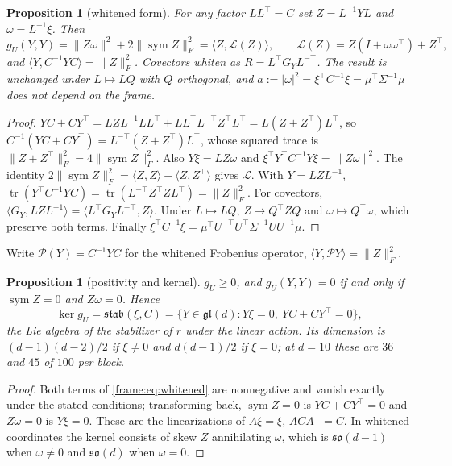 \documentclass[11pt]{article}
\newtheorem{proposition}[theorem]{Proposition}
\theoremstyle{definition}
\theoremstyle{remark}
\providecommand{\gl}{\mathfrak{gl}}
\providecommand{\tr}{\operatorname{tr}}
\providecommand{\sym}{\operatorname{sym}}
\providecommand{\stab}{\mathfrak{stab}}
\providecommand{\ip}[2]{\langle #1, #2\rangle}
\begin{document}
\begin{proposition}[whitened form]\label{frame:prop:whitened}
For any factor $LL^\top=C$ set $Z=L^{-1}YL$ and $\omega=L^{-1}\xi$. Then
\begin{equation}\label{frame:eq:whitened}
g_U(Y,Y)=\|Z\omega\|^2+2\|\sym Z\|_F^2=\ip{Z}{\mathcal{L}(Z)},\qquad \mathcal{L}(Z)=Z(I+\omega\omega^\top)+Z^\top,
\end{equation}
and $\ip{Y}{C^{-1}YC}=\|Z\|_F^2$. Covectors whiten as $R=L^\top G_YL^{-\top}$. The result is unchanged under $L\mapsto LQ$ with $Q$ orthogonal, and $a:=|\omega|^2=\xi^\top C^{-1}\xi=\mu^\top\Sigma^{-1}\mu$ does not depend on the frame.
\end{proposition}
\begin{proof}
$YC+CY^\top=LZL^{-1}LL^\top+LL^\top L^{-\top}Z^\top L^\top=L(Z+Z^\top)L^\top$, so $C^{-1}(YC+CY^\top)=L^{-\top}(Z+Z^\top)L^\top$, whose squared trace is $\|Z+Z^\top\|_F^2=4\|\sym Z\|_F^2$. Also $Y\xi=LZ\omega$ and $\xi^\top Y^\top C^{-1}Y\xi=\|Z\omega\|^2$. The identity $2\|\sym Z\|_F^2=\ip{Z}{Z}+\ip{Z}{Z^\top}$ gives $\mathcal{L}$. With $Y=LZL^{-1}$, $\tr(Y^\top C^{-1}YC)=\tr(L^{-\top}Z^\top ZL^\top)=\|Z\|_F^2$. For covectors, $\ip{G_Y}{LZL^{-1}}=\ip{L^\top G_YL^{-\top}}{Z}$. Under $L\mapsto LQ$, $Z\mapsto Q^\top ZQ$ and $\omega\mapsto Q^\top\omega$, which preserve both terms. Finally $\xi^\top C^{-1}\xi=\mu^\top U^{-\top}U^\top\Sigma^{-1}UU^{-1}\mu$.
\end{proof}

Write $\mathcal{P}(Y)=C^{-1}YC$ for the whitened Frobenius operator, $\ip{Y}{\mathcal{P}Y}=\|Z\|_F^2$.

\begin{proposition}[positivity and kernel]\label{frame:prop:kernel}
$g_U\ge0$, and $g_U(Y,Y)=0$ if and only if $\sym Z=0$ and $Z\omega=0$. Hence
\begin{equation}\label{frame:eq:kernel}
\ker g_U=\stab(\xi,C)=\{Y\in\gl(d):Y\xi=0,\ YC+CY^\top=0\},
\end{equation}
the Lie algebra of the stabilizer of $r$ under the linear action. Its dimension is $(d-1)(d-2)/2$ if $\xi\neq0$ and $d(d-1)/2$ if $\xi=0$; at $d=10$ these are $36$ and $45$ of $100$ per block.
\end{proposition}
\begin{proof}
Both terms of \eqref{frame:eq:whitened} are nonnegative and vanish exactly under the stated conditions; transforming back, $\sym Z=0$ is $YC+CY^\top=0$ and $Z\omega=0$ is $Y\xi=0$. These are the linearizations of $A\xi=\xi$, $ACA^\top=C$. In whitened coordinates the kernel consists of skew $Z$ annihilating $\omega$, which is $\mathfrak{so}(d-1)$ when $\omega\neq0$ and $\mathfrak{so}(d)$ when $\omega=0$.
\end{proof}
\end{document}
